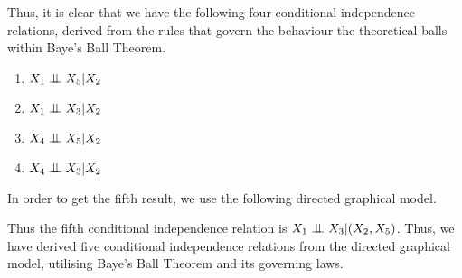 \documentclass[a4paper]{article}
\newcommand{\indep}{\mathrel{\text{\scalebox{1.07}{$\perp\mkern-10mu\perp$}}}}
\begin{document}
\begin{enumerate}[label=\textbf{\arabic*.}]
\begin{enumerate}
\begin{center}
\begin{tikzpicture}
			\end{tikzpicture}
		\end{center}

		\bigbreak

		Thus, it is clear that we have the following four conditional independence relations, derived from the rules that govern the behaviour the theoretical balls within Baye's Ball Theorem.

		\begin{enumerate}
			\item $\displaystyle{X_1 \indep X_5 | X_2}$
			\item $\displaystyle{X_1 \indep X_3 | X_2}$
			\item $\displaystyle{X_4 \indep X_5 | X_2}$
			\item $\displaystyle{X_4 \indep X_3 | X_2}$

		\end{enumerate}

		In order to get the fifth result, we use the following directed graphical model.

		\bigbreak

		\begin{center}
		\end{center}

		\bigbreak

		Thus the fifth conditional independence relation is $\displaystyle{X_1 \indep X_3 | (X_2,X_5)}$. Thus, we have derived five conditional independence relations from the directed graphical model, utilising Baye's Ball Theorem and its governing laws.
		

\end{enumerate}
\end{enumerate}
\end{document}

